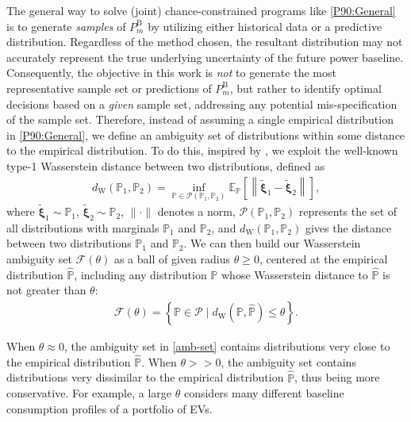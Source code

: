 \documentclass[conference]{IEEEtran}
\begin{document}
The general way to solve (joint) chance-constrained programs like \eqref{P90:General} is to generate \textit{samples} of $P_{m}^{\text{B}}$ by utilizing either historical data or a predictive distribution. Regardless of the method chosen, the resultant distribution may not accurately represent the true underlying uncertainty of the future power baseline. Consequently, the objective in this work is \textit{not} to generate the most representative sample set or predictions of $P_{m}^{\text{B}}$, but rather to identify optimal decisions based on a \textit{given} sample set, addressing any potential mis-specification of the sample set.
%
Therefore, instead of assuming a single empirical distribution in \eqref{P90:General}, we define an ambiguity set of distributions within some distance to the empirical distribution. To do this, inspired by \cite{chen2022data}, we exploit the well-known type-1 Wasserstein distance between two distributions, defined as
%
\begin{align}\label{was}
    d_{\mathrm{W}}\left(\mathbb{P}_1, \mathbb{P}_2\right)=\inf _{\mathbb{P} \in \mathcal{P}\left(\mathbb{P}_1, \mathbb{P}_2\right)} \mathbb{E}_{\mathbb{P}}\left[\left\|\tilde{\boldsymbol{\xi}}_1-\tilde{\boldsymbol{\xi}}_2\right\|\right],
\end{align}
where $\tilde{\boldsymbol{\xi}}_1 \sim \mathbb{P}_1$, $\tilde{\boldsymbol{\xi}}_2 \sim \mathbb{P}_2$, $\|\cdot\|$ denotes a norm, $\mathcal{P}\left(\mathbb{P}_1, \mathbb{P}_2\right)$ represents  the set of all distributions with marginals $\mathbb{P}_1$ and $\mathbb{P}_2$, and 
 $d_{\mathrm{W}}\left(\mathbb{P}_1, \mathbb{P}_2\right)$ gives the distance between two distributions $\mathbb{P}_1$ and $\mathbb{P}_2$.
We can then build our Wasserstein ambiguity set   $\mathcal{F}(\theta)$ as a ball of given radius $\theta \geq 0$, centered at the empirical distribution $\hat{\mathbb{P}}$, including any distribution $\mathbb{P}$ whose Wasserstein distance to $\hat{\mathbb{P}}$ is not greater than $\theta$:
%
\begin{align}\label{amb-set}
    \mathcal{F}(\theta)=\left\{\mathbb{P} \in \mathcal{P} \mid d_{\mathrm{W}}(\mathbb{P}, \hat{\mathbb{P}}) \leq \theta\right\}.
\end{align}

When $\theta \approx 0$, the ambiguity set in \eqref{amb-set} contains distributions very close to the empirical distribution $\hat{\mathbb{P}}$. When $\theta\!>>\!0$, the ambiguity set contains distributions very dissimilar to the empirical distribution $\hat{\mathbb{P}}$, thus being more conservative. For example, a large $\theta$ considers many different baseline consumption profiles of a portfolio of \acp{EV}.
\end{document}
